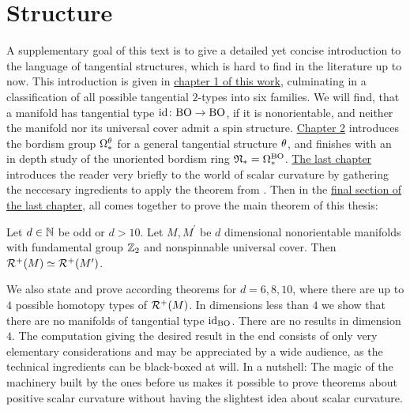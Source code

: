 \section*{Structure}
A supplementary goal of this text is to give a detailed yet concise introduction to the language of tangential structures, which is hard to find in the literature up to now.
This introduction is given in \hyperlink{section.1}{chapter 1 of this work}, culminating in a classification of all possible tangential $2$-types into six families.
We will find, that a manifold has tangential type $\operatorname{id}\colon\mathrm{BO} \to \mathrm{BO}$, if it is nonorientable, and neither the manifold nor its universal cover admit a spin structure.
\hyperref[sec:bordism]{Chapter 2} introduces the bordism group $\Omega_\ast^\theta$ for a general tangential structure $\theta$, and finishes with an in depth study of the unoriented bordism ring $\mathfrak{N}_\ast = \Omega_\ast^{\mathrm{BO}}$.
\hyperref[sec:psc]{The last chapter} introduces the reader very briefly to the world of scalar curvature by gathering the neccesary ingredients to apply the theorem from \cite{ew:psc}.
Then in the \hyperlink{subsection.3.2}{final section of the last chapter}, all comes together to prove the main theorem of this thesis:
\begin{theorem*}
    Let $d\in\mathbb{N}$ be odd or $d>10$. Let $M,M^\prime$ be $d$ dimensional nonorientable manifolds with fundamental group $\mathbb{Z}_2$ and nonspinnable universal cover. Then $\mathcal{R}^+(M)\simeq \mathcal{R}^+(M^\prime)$.
\end{theorem*}
We also state and prove according theorems for $d=6,8,10$, where there are up to $4$ possible homotopy types of $\mathcal{R}^+(M)$. 
In dimensions less than $4$ we show that there are no manifolds of tangential type $\operatorname{id}_{\mathrm{BO}}$.
There are no results in dimension $4$.
The computation giving the desired result in the end consists of only very elementary considerations and may be appreciated by a wide audience, as the technical ingredients can be black-boxed at will.
In a nutshell: The magic of the machinery built by the ones before us makes it possible to prove theorems about positive scalar curvature without having the slightest idea about scalar curvature.
